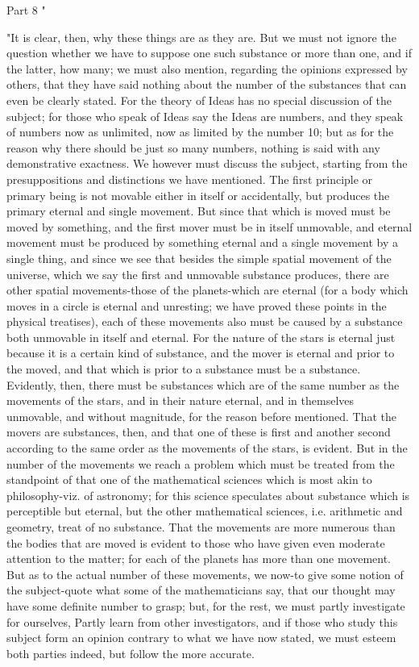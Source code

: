 Part 8 "

"It is clear, then, why these things are as they are. But we must
not ignore the question whether we have to suppose one such substance
or more than one, and if the latter, how many; we must also mention,
regarding the opinions expressed by others, that they have said nothing
about the number of the substances that can even be clearly stated.
For the theory of Ideas has no special discussion of the subject;
for those who speak of Ideas say the Ideas are numbers, and they speak
of numbers now as unlimited, now as limited by the number 10; but
as for the reason why there should be just so many numbers, nothing
is said with any demonstrative exactness. We however must discuss
the subject, starting from the presuppositions and distinctions we
have mentioned. The first principle or primary being is not movable
either in itself or accidentally, but produces the primary eternal
and single movement. But since that which is moved must be moved by
something, and the first mover must be in itself unmovable, and eternal
movement must be produced by something eternal and a single movement
by a single thing, and since we see that besides the simple spatial
movement of the universe, which we say the first and unmovable substance
produces, there are other spatial movements-those of the planets-which
are eternal (for a body which moves in a circle is eternal and unresting;
we have proved these points in the physical treatises), each of these
movements also must be caused by a substance both unmovable in itself
and eternal. For the nature of the stars is eternal just because it
is a certain kind of substance, and the mover is eternal and prior
to the moved, and that which is prior to a substance must be a substance.
Evidently, then, there must be substances which are of the same number
as the movements of the stars, and in their nature eternal, and in
themselves unmovable, and without magnitude, for the reason before
mentioned. That the movers are substances, then, and that one of these
is first and another second according to the same order as the movements
of the stars, is evident. But in the number of the movements we reach
a problem which must be treated from the standpoint of that one of
the mathematical sciences which is most akin to philosophy-viz. of
astronomy; for this science speculates about substance which is perceptible
but eternal, but the other mathematical sciences, i.e. arithmetic
and geometry, treat of no substance. That the movements are more numerous
than the bodies that are moved is evident to those who have given
even moderate attention to the matter; for each of the planets has
more than one movement. But as to the actual number of these movements,
we now-to give some notion of the subject-quote what some of the mathematicians
say, that our thought may have some definite number to grasp; but,
for the rest, we must partly investigate for ourselves, Partly learn
from other investigators, and if those who study this subject form
an opinion contrary to what we have now stated, we must esteem both
parties indeed, but follow the more accurate. 

